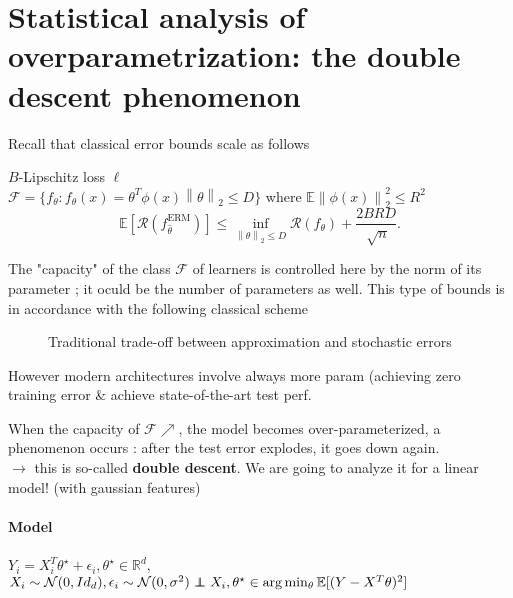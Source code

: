 \section{Statistical analysis of overparametrization: the double descent phenomenon}

Recall that classical error bounds scale as follows
\begin{prop}[]
    $B$-Lipschitz loss $\ell$ \\
    $\mathcal{F} = \{f_\theta : f_\theta (x) = \theta ^T \phi (x) \left\| \theta  \right\|_2 \leq D \}$ where $\mathbb{E} \left\| \phi (x) \right\|^2_2 \leq R^2 $ 
    \[
        \mathbb{E}[\mathcal{R}(f_{\hat{\theta }}^{\text{ERM}})] \leq \inf _{\left\| \theta  \right\|_2 \leq D } \mathcal{R}(f_\theta ) + \frac{2BRD}{\sqrt[]{n}}
    .\]
\end{prop}

The "capacity" of the class $ \mathcal{F} $ of learners is controlled here by the norm of its parameter ; it oculd be the number of parameters as well. This type of bounds is in accordance with the following classical scheme

\begin{figure}[H] %
    \centering
    \caption{Traditional trade-off between approximation and stochastic errors}
\end{figure}
However modern architectures involve always more param (achieving zero training error \& achieve state-of-the-art test perf.

\begin{figure}[H] %
    \centering
\end{figure}

When the capacity of $\mathcal{F} \nearrow $, the model becomes over-parameterized, a phenomenon occurs : after the test error explodes, it goes down again.\\
$\rightarrow $ this is so-called \textbf{double descent}.
We are going to analyze it for a linear model! (with gaussian features) 

\paragraph{Model} $ Y_i = X_i^T \theta ^\star + \epsilon _i, \theta ^\star \in \mathbb{R}^d $, $ X_i \sim \mathcal{N}(0, Id_d), \epsilon _i \sim \mathcal{N}(0, \sigma ^2) \perp\!\!\!\!\perp X_i, \theta ^\star \in \arg \min _\theta \mathbb{E}[ (Y - X^T \theta )^2] $ 
